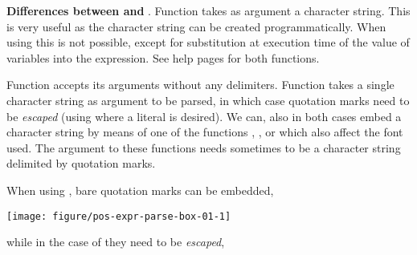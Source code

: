 \documentclass[krantz2]{krantz}\usepackage{knitr}%
\begin{document}
\begin{explainbox}
\textbf{Differences between  and }. Function  takes as argument a character string. This is very useful as the character string can be created programmatically. When using  this is not possible, except for substitution at execution time of the value of variables into the expression. See help pages for both functions.

Function  accepts its arguments without any delimiters. Function  takes a single character string as argument to be parsed, in which case quotation marks need to be \emph{escaped} (using  where a literal  is desired). We can, also in both cases embed a character string by means of one of the functions , ,  or  which also affect the font used. The argument to these functions needs sometimes to be a character string delimited by quotation marks.

When using , bare quotation marks can be embedded,

\begin{knitrout}\footnotesize
{}\color{fgcolor}\begin{kframe}
\begin{alltt}
  \hlopt{+}
  \hlstd{()} \hlopt{+}
  \hlstd{(}\hlstd{(x[}\hlstd{]}\hlopt{*}\hlstd{))}
\end{alltt}
\end{kframe}

{\centering \texttt{[image: figure/pos-expr-parse-box-01-1]} 

}



\end{knitrout}

while in the case of  they need to be \emph{escaped},

\begin{knitrout}\footnotesize
{}\color{fgcolor}\begin{kframe}
\begin{alltt}
  \hlopt{+}
  \hlstd{()} \hlopt{+}
  \hlstd{(}\hlstd{(} \hlstd{=} \hlstd{))}
\end{alltt}
\end{kframe}


\end{knitrout}
\end{explainbox}
\end{document}
